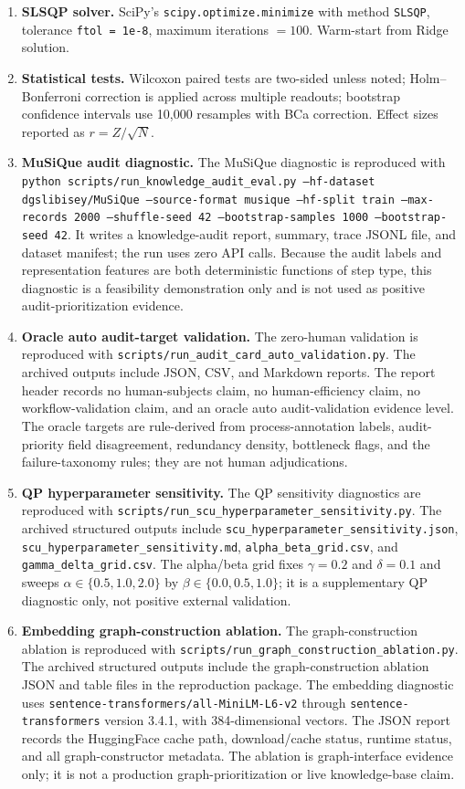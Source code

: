 \documentclass[a4paper,fleqn]{cas-sc}
\begin{document}
\begin{enumerate}
\item \textbf{SLSQP solver.} SciPy's \texttt{scipy.optimize.minimize} with method \texttt{SLSQP}, tolerance \texttt{ftol = 1e-8}, maximum iterations $= 100$. Warm-start from Ridge solution.
\item \textbf{Statistical tests.} Wilcoxon paired tests are two-sided unless noted; Holm--Bonferroni correction is applied across multiple readouts; bootstrap confidence intervals use 10{,}000 resamples with BCa correction. Effect sizes reported as $r = Z/\sqrt{N}$.
\item \textbf{MuSiQue audit diagnostic.} The MuSiQue diagnostic is reproduced with \texttt{python scripts/run\_knowledge\_audit\_eval.py --hf-dataset dgslibisey/MuSiQue --source-format musique --hf-split train --max-records 2000 --shuffle-seed 42 --bootstrap-samples 1000 --bootstrap-seed 42}. It writes a knowledge-audit report, summary, trace JSONL file, and dataset manifest; the run uses zero API calls. Because the audit labels and representation features are both deterministic functions of step type, this diagnostic is a feasibility demonstration only and is not used as positive audit-prioritization evidence.
\item \textbf{Oracle auto audit-target validation.} The zero-human validation is reproduced with \texttt{scripts/run\_audit\_card\_auto\_validation.py}. The archived outputs include JSON, CSV, and Markdown reports. The report header records no human-subjects claim, no human-efficiency claim, no workflow-validation claim, and an oracle auto audit-validation evidence level. The oracle targets are rule-derived from process-annotation labels, audit-priority field disagreement, redundancy density, bottleneck flags, and the failure-taxonomy rules; they are not human adjudications.
\item \textbf{QP hyperparameter sensitivity.} The QP sensitivity diagnostics are reproduced with \texttt{scripts/run\_scu\_hyperparameter\_sensitivity.py}. The archived structured outputs include \texttt{scu\_hyperparameter\_sensitivity.json}, \texttt{scu\_hyperparameter\_sensitivity.md}, \texttt{alpha\_beta\_grid.csv}, and \texttt{gamma\_delta\_grid.csv}. The alpha/beta grid fixes $\gamma=0.2$ and $\delta=0.1$ and sweeps $\alpha \in \{0.5,1.0,2.0\}$ by $\beta \in \{0.0,0.5,1.0\}$; it is a supplementary QP diagnostic only, not positive external validation.
\item \textbf{Embedding graph-construction ablation.} The graph-construction ablation is reproduced with \texttt{scripts/run\_graph\_construction\_ablation.py}. The archived structured outputs include the graph-construction ablation JSON and table files in the reproduction package. The embedding diagnostic uses \texttt{sentence-transformers/all-MiniLM-L6-v2} through \texttt{sentence-transformers} version 3.4.1, with 384-dimensional vectors. The JSON report records the HuggingFace cache path, download/cache status, runtime status, and all graph-constructor metadata. The ablation is graph-interface evidence only; it is not a production graph-prioritization or live knowledge-base claim.

\end{enumerate}
\end{document}

